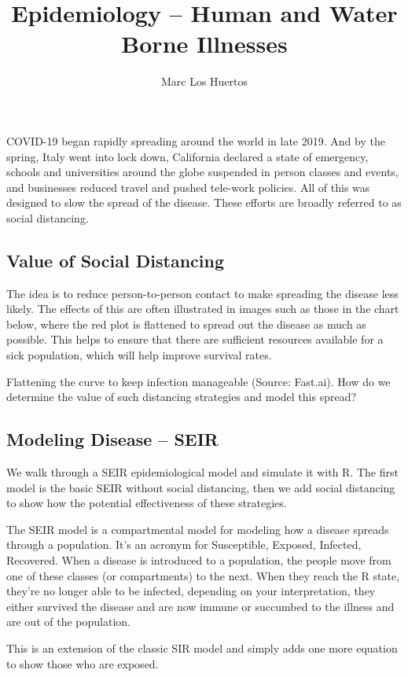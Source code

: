\documentclass{article}\usepackage[]{graphicx}\usepackage[]{color}
\title{Epidemiology -- Human and Water Borne Illnesses}
\author{Marc Los Huertos}
\begin{document}
\maketitle

COVID-19 began rapidly spreading around the world in late 2019. And by the spring, Italy went into lock down, California declared a state of emergency, schools and universities around the globe suspended in person classes and events, and businesses reduced travel and pushed tele-work policies. All of this was designed to slow the spread of the disease. These efforts are broadly referred to as social distancing.

\subsection{Value of Social Distancing}
The idea is to reduce person-to-person contact to make spreading the disease less likely. The effects of this are often illustrated in images such as those in the chart below, where the red plot is flattened to spread out the disease as much as possible. This helps to ensure that there are sufficient resources available for a sick population, which will help improve survival rates.

Flattening the curve to keep infection manageable (Source: Fast.ai).
How do we determine the value of such distancing strategies and model this spread?

\subsection{Modeling Disease -- SEIR}

We walk through a SEIR epidemiological model and simulate it with R. The first model is the basic SEIR without social distancing, then we add social distancing to show how the potential effectiveness of these strategies.

The SEIR model is a compartmental model for modeling how a disease spreads through a population. It's an acronym for Susceptible, Exposed, Infected, Recovered. When a disease is introduced to a population, the people move from one of these classes (or compartments) to the next. When they reach the R state, they're no longer able to be infected, depending on your interpretation, they either survived the disease and are now immune or succumbed to the illness and are out of the population.

This is an extension of the classic SIR model and simply adds one more equation to show those who are exposed. 
\end{document}
